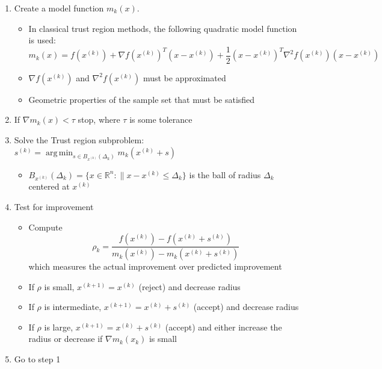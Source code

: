 \documentclass{article}
\DeclareMathOperator*{\argmin}{arg\,min}
\begin{document}
\begin{enumerate}
	\item Create a model function $m_k(x)$.
	\begin {itemize}
		\item In classical trust region methods, the following quadratic model function is used:
		\[
		m_k(x) = f(x^{(k)}) + \nabla f(x^{(k)})^T (x-x^{(k)}) + \frac 1 2 (x-x^{(k)})^T\nabla^2f(x^{(k)})(x-x^{(k)})
		\]
	\end{itemize}
	\begin{itemize}
		\item $\nabla f(x^{(k)})$ and $\nabla^2 f(x^{(k)})$ must be approximated
		\item Geometric properties of the sample set that must be satisfied
	\end{itemize}
	
	\item If $\nabla m_k(x) < \tau$ stop, where $\tau$ is some tolerance
	
	\item Solve the Trust region subproblem: $s^{(k)} = \argmin_{s\in B_{x^{(k)}}( \Delta_k)} m_k(x^{(k)} + s)$
	\begin {itemize}
		\item $B_{x^{(k)}}(\Delta_k) = \{ x \in \mathbb{R}^n : \| x - x^{(k)} \le \Delta_k \}$ 
		is the ball of radius $\Delta_k$ centered at $x^{(k)}$
	\end{itemize}
	
	\item Test for improvement
	\begin{itemize}
		\item Compute
\begin{equation}
\label{rho}
\rho_k = \frac{f(x^{(k)}) - f(x^{(k)}+s^{(k)})}{m_k(x^{(k)}) - m_k(x^{(k)}+s^{(k)})}
\end{equation}
which measures the actual improvement over predicted improvement
		\item If $\rho$ is small, $x^{(k+1)}=x^{(k)}$ (reject) and decrease radius
		\item If $\rho$ is intermediate, $x^{(k+1)}=x^{(k)}+s^{(k)}$ (accept) and decrease radius
		\item If $\rho$ is large, $x^{(k+1)}=x^{(k)}+s^{(k)}$ (accept) and either increase the radius or decrease if $\nabla m_k(x_k)$ is small
	\end{itemize}
	
	\item Go to step 1
\end{enumerate}
\end{document}
